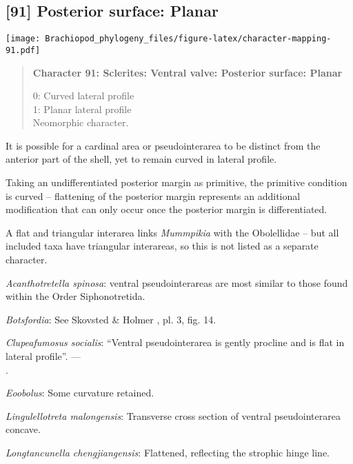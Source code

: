 \documentclass[openany]{book}
\theoremstyle{definition}
\theoremstyle{definition}
\theoremstyle{definition}
\theoremstyle{remark}
\begin{document}
\subsection*{{[}91{]} Posterior surface:
Planar}\label{posterior-surface-planar}

\texttt{[image: Brachiopod\_phylogeny\_files/figure-latex/character-mapping-91.pdf]}

\begin{quote}
\textbf{Character 91: Sclerites: Ventral valve: Posterior surface:
Planar}

0: Curved lateral profile\\
1: Planar lateral profile\\
Neomorphic character.
\end{quote}

It is possible for a cardinal area or pseudointerarea to be distinct
from the anterior part of the shell, yet to remain curved in lateral
profile.

Taking an undifferentiated posterior margin as primitive, the primitive
condition is curved -- flattening of the posterior margin represents an
additional modification that can only occur once the posterior margin is
differentiated.

A flat and triangular interarea links \emph{Mummpikia} with the
Obolellidae \citep{Balthasar2008iMummpikia} -- but all included taxa
have triangular interareas, so this is not listed as a separate
character.

\hypertarget{Acanthotretella_spinosa-coding-91}{}
\emph{Acanthotretella spinosa}: ventral pseudointerareas are most
similar to those found within the Order Siphonotretida.

\hypertarget{Botsfordia-coding-91}{}
\emph{Botsfordia}: See Skovsted \& Holmer
\citeyearpar{Skovsted2005EarlyCambrian}, pl. 3, fig. 14.

\hypertarget{Clupeafumosus_socialis-coding-91}{}
\emph{Clupeafumosus socialis}: ``Ventral pseudointerarea is gently
procline and is flat in lateral profile''. ---\\
\citep{Topper2013Reappraisalof}.

\hypertarget{Eoobolus-coding-91}{}
\emph{Eoobolus}: Some curvature retained.

\hypertarget{Lingulellotreta_malongensis-coding-91}{}
\emph{Lingulellotreta malongensis}: Transverse cross section of ventral
pseudointerarea concave.

\hypertarget{Longtancunella_chengjiangensis-coding-91}{}
\emph{Longtancunella chengjiangensis}: Flattened, reflecting the
strophic hinge line.
\end{document}
